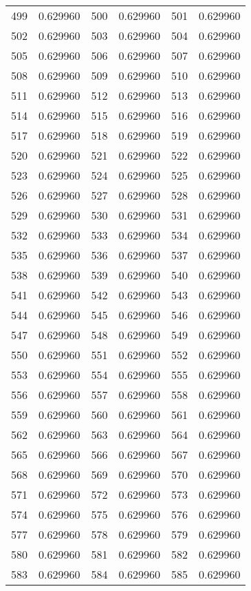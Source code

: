 \documentclass[12pt]{article}
\begin{document}
\begin{longtable}{@{}cc|cc|cc@{}}
499 & 0.629960 & 500 & 0.629960 & 501 & 0.629960 \\
502 & 0.629960 & 503 & 0.629960 & 504 & 0.629960 \\
505 & 0.629960 & 506 & 0.629960 & 507 & 0.629960 \\
508 & 0.629960 & 509 & 0.629960 & 510 & 0.629960 \\
511 & 0.629960 & 512 & 0.629960 & 513 & 0.629960 \\
514 & 0.629960 & 515 & 0.629960 & 516 & 0.629960 \\
517 & 0.629960 & 518 & 0.629960 & 519 & 0.629960 \\
520 & 0.629960 & 521 & 0.629960 & 522 & 0.629960 \\
523 & 0.629960 & 524 & 0.629960 & 525 & 0.629960 \\
526 & 0.629960 & 527 & 0.629960 & 528 & 0.629960 \\
529 & 0.629960 & 530 & 0.629960 & 531 & 0.629960 \\
532 & 0.629960 & 533 & 0.629960 & 534 & 0.629960 \\
535 & 0.629960 & 536 & 0.629960 & 537 & 0.629960 \\
538 & 0.629960 & 539 & 0.629960 & 540 & 0.629960 \\
541 & 0.629960 & 542 & 0.629960 & 543 & 0.629960 \\
544 & 0.629960 & 545 & 0.629960 & 546 & 0.629960 \\
547 & 0.629960 & 548 & 0.629960 & 549 & 0.629960 \\
550 & 0.629960 & 551 & 0.629960 & 552 & 0.629960 \\
553 & 0.629960 & 554 & 0.629960 & 555 & 0.629960 \\
556 & 0.629960 & 557 & 0.629960 & 558 & 0.629960 \\
559 & 0.629960 & 560 & 0.629960 & 561 & 0.629960 \\
562 & 0.629960 & 563 & 0.629960 & 564 & 0.629960 \\
565 & 0.629960 & 566 & 0.629960 & 567 & 0.629960 \\
568 & 0.629960 & 569 & 0.629960 & 570 & 0.629960 \\
571 & 0.629960 & 572 & 0.629960 & 573 & 0.629960 \\
574 & 0.629960 & 575 & 0.629960 & 576 & 0.629960 \\
577 & 0.629960 & 578 & 0.629960 & 579 & 0.629960 \\
580 & 0.629960 & 581 & 0.629960 & 582 & 0.629960 \\
583 & 0.629960 & 584 & 0.629960 & 585 & 0.629960 \\

\end{longtable}
\end{document}
